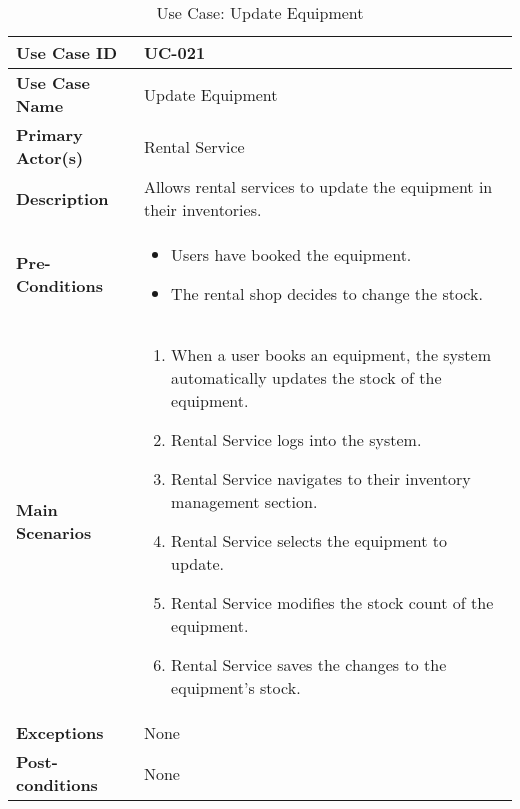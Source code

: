 \begin{table}[ht]
    \centering
    \begin{tabular}{|l|p{}|}
        \hline
        \textbf{Use Case ID} & UC-021 \\
        \hline
        \textbf{Use Case Name} & Update Equipment \\
        \hline
        \textbf{Primary Actor(s)} & Rental Service \\
        \hline
        \textbf{Description} & Allows rental services to update the equipment in their inventories. \\
        \hline
        \textbf{Pre-Conditions} & 
        \begin{itemize}[itemsep=0pt]
            \item Users have booked the equipment.
            \item The rental shop decides to change the stock.
        \end{itemize} \\
        \hline
        \textbf{Main Scenarios} & 
        \begin{enumerate}[label=\arabic*.,itemsep=0pt]
            \item When a user books an equipment, the system automatically updates the stock of the equipment.
            \item Rental Service logs into the system.
            \item Rental Service navigates to their inventory management section.
            \item Rental Service selects the equipment to update.
            \item Rental Service modifies the stock count of the equipment.
            \item Rental Service saves the changes to the equipment's stock.
        \end{enumerate} \\
        \hline
        \textbf{Exceptions} & None \\
        \hline
        \textbf{Post-conditions} & None \\
        \hline
    \end{tabular}
    \label{tab:use-case-update-equipment}
    \caption{Use Case: Update Equipment}
\end{table}


